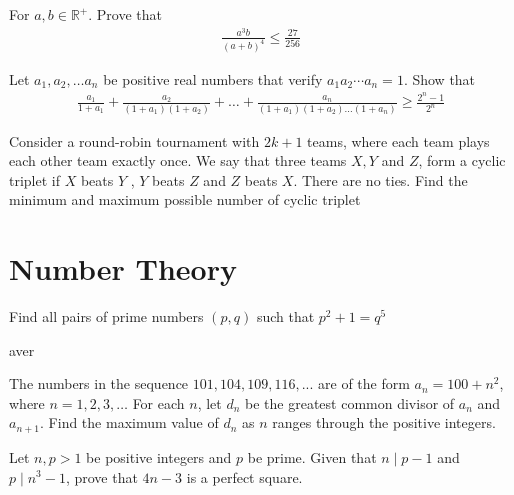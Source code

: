 \begin{problem}[Q][5][Pathfinder]
    For $a,b \in \mathbb{R}^+$. Prove that 
    \begin{align*}
        \frac{a^3b}{(a+b)^4} \leq \frac{27}{256}
    \end{align*}
\end{problem}

\begin{problem}
    Let $a_1,a_2,\ldots a_n$ be positive real numbers that verify $a_1a_2 \cdots a_n=1$. Show that 
    \begin{align*}
        \frac{a_1}{1+a_1}+\frac{a_2}{(1+a_1)(1+a_2)}+\ldots+\frac{a_n}{(1+a_1)(1+a_2) \ldots (1+a_n)} \geq \frac{2^n-1}{2^n}
    \end{align*}
\end{problem}

\begin{problem}
    Consider a round-robin tournament with $2k + 1$ teams, where each team plays each other team exactly once. We say that three teams $X, Y$ and $Z$, form a cyclic triplet if $X$ beats $Y$ , $Y$ beats $Z$ and $Z$ beats $X$. There are no ties. Find the minimum and maximum possible number of cyclic triplet
\end{problem}


\newpage
\thispagestyle{firstpageheader}
\section{Number Theory}

\begin{problem}[N][1]
    Find all pairs of prime numbers $(p,q)$ such that $p^2+1=q^5$
\end{problem}

\begin{solution}
    aver
\end{solution}

\begin{problem}[N][4][AIME 1985]
    The numbers in the sequence $101, 104, 109,116, . . .$ are of the form $a_n = 100+n^2$, where $n = 1,2,3,\ldots$ For each $n$, let $d_n$ be the greatest common divisor of $a_n$ and $a_{n+1}$. Find the maximum value of $d_n$ as $n$ ranges through the positive integers.
\end{problem}


\begin{problem}[N][3][Iran 2005]
    Let $n,p>1$ be positive integers and $p$ be prime. Given that $n \mid p-1$ and $p \mid n^3-1$, prove that $4n-3$ is a perfect square.
\end{problem}

